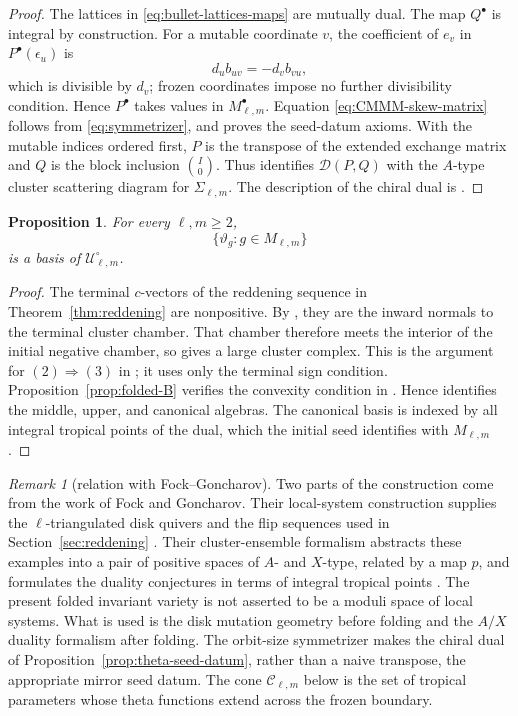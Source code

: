 \documentclass[11pt]{amsart}
\newtheorem{proposition}[theorem]{Proposition}
\theoremstyle{definition}
\theoremstyle{remark}
\newtheorem{remark}[theorem]{Remark}
\newcommand{\cU}{\mathcal U}
\begin{document}
\begin{proof}
The lattices in \eqref{eq:bullet-lattices-maps} are mutually dual.  The map
$Q^{\bullet}$ is integral by construction.  For a mutable coordinate $v$,
the coefficient of $e_v$ in $P^{\bullet}(\epsilon_u)$ is
\[ d_ub_{uv}=-d_vb_{vu}, \]
which is divisible by $d_v$; frozen coordinates impose no further
divisibility condition.  Hence $P^{\bullet}$ takes values in
$M_{\ell,m}^{\bullet}$.  Equation \eqref{eq:CMMM-skew-matrix} follows from
\eqref{eq:symmetrizer}, and proves the seed-datum axioms.  With the mutable
indices ordered first, $P$ is the transpose of the extended exchange matrix
and $Q$ is the block inclusion $\binom{I}{0}$.  Thus
\cite[Example~4.2]{CMMM} identifies $\mathcal D(P,Q)$ with the $A$-type
cluster scattering diagram for $\Sigma_{\ell,m}$.  The description of the
chiral dual is \cite[Section~4.5]{CMMM}.
\end{proof}


\begin{proposition}\label{prop:open-theta-basis}
For every $\ell,m\ge2$,
\[ \{\vartheta_g:g\in M_{\ell,m}\} \]
is a basis of $\cU_{\ell,m}^{\circ}$.
\end{proposition}

\begin{proof}
The terminal $c$-vectors of the reddening sequence in
Theorem~\ref{thm:reddening} are nonpositive.  By
\cite[Lemma~5.12]{GHKK}, they are the inward normals to the terminal cluster
chamber.  That chamber therefore meets the interior of the initial negative
chamber, so \cite[Lemma~8.29]{GHKK} gives a large cluster complex.  This is
the argument for $(2)\Rightarrow(3)$ in \cite[Corollary~8.30]{GHKK}; it uses
only the terminal sign condition.  Proposition~\ref{prop:folded-B} verifies
the convexity condition in \cite[Theorem~0.3(7)]{GHKK}.  Hence
\cite[Proposition~8.28 and Definition~0.6]{GHKK} identifies the middle,
upper, and canonical algebras.  The canonical basis is indexed by all
integral tropical points of the dual, which the initial seed identifies
with $M_{\ell,m}$.
\end{proof}

\begin{remark}[relation with Fock--Goncharov]
\label{rem:Fock-Goncharov-relation}
Two parts of the construction come from the work of Fock and Goncharov.  Their
local-system construction supplies the $\ell$-triangulated disk quivers and
the flip sequences used in Section~\ref{sec:reddening}
\cite[Section~10]{FockGoncharov}.  Their cluster-ensemble formalism
abstracts these examples into a pair of positive spaces of $A$- and
$X$-type, related by a map $p$, and formulates the duality conjectures in
terms of integral tropical points
\cite[Sections~1--4]{FockGoncharovEnsembles}.  The present folded invariant
variety is not asserted to be a moduli space of local systems.  What is used
is the disk mutation geometry before folding and the $A/X$ duality
formalism after folding.  The orbit-size symmetrizer makes the chiral dual
of Proposition~\ref{prop:theta-seed-datum}, rather than a naive transpose,
the appropriate mirror seed datum.  The cone $\mathscr C_{\ell,m}$ below is
the set of tropical parameters whose theta functions extend across the
frozen boundary.
\end{remark}
\end{document}

